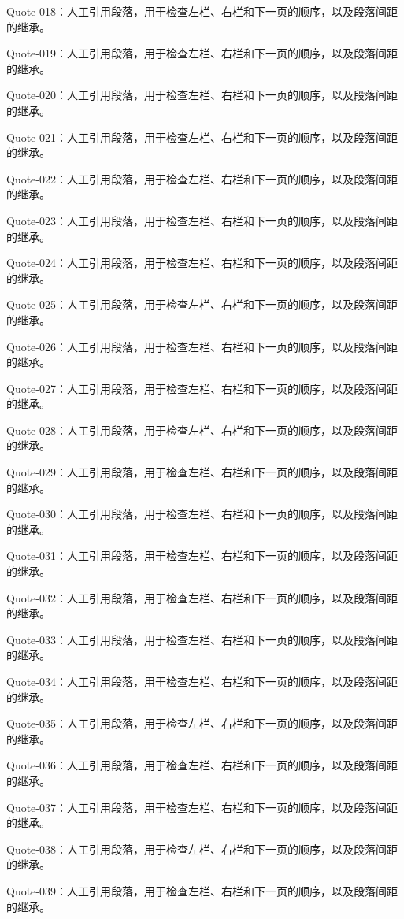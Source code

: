 \documentclass{article}
\begin{document}
\begin{quoteblock}
Quote-018：人工引用段落，用于检查左栏、右栏和下一页的顺序，以及段落间距的继承。

Quote-019：人工引用段落，用于检查左栏、右栏和下一页的顺序，以及段落间距的继承。

Quote-020：人工引用段落，用于检查左栏、右栏和下一页的顺序，以及段落间距的继承。

Quote-021：人工引用段落，用于检查左栏、右栏和下一页的顺序，以及段落间距的继承。

Quote-022：人工引用段落，用于检查左栏、右栏和下一页的顺序，以及段落间距的继承。

Quote-023：人工引用段落，用于检查左栏、右栏和下一页的顺序，以及段落间距的继承。

Quote-024：人工引用段落，用于检查左栏、右栏和下一页的顺序，以及段落间距的继承。

Quote-025：人工引用段落，用于检查左栏、右栏和下一页的顺序，以及段落间距的继承。

Quote-026：人工引用段落，用于检查左栏、右栏和下一页的顺序，以及段落间距的继承。

Quote-027：人工引用段落，用于检查左栏、右栏和下一页的顺序，以及段落间距的继承。

Quote-028：人工引用段落，用于检查左栏、右栏和下一页的顺序，以及段落间距的继承。

Quote-029：人工引用段落，用于检查左栏、右栏和下一页的顺序，以及段落间距的继承。

Quote-030：人工引用段落，用于检查左栏、右栏和下一页的顺序，以及段落间距的继承。

Quote-031：人工引用段落，用于检查左栏、右栏和下一页的顺序，以及段落间距的继承。

Quote-032：人工引用段落，用于检查左栏、右栏和下一页的顺序，以及段落间距的继承。

Quote-033：人工引用段落，用于检查左栏、右栏和下一页的顺序，以及段落间距的继承。

Quote-034：人工引用段落，用于检查左栏、右栏和下一页的顺序，以及段落间距的继承。

Quote-035：人工引用段落，用于检查左栏、右栏和下一页的顺序，以及段落间距的继承。

Quote-036：人工引用段落，用于检查左栏、右栏和下一页的顺序，以及段落间距的继承。

Quote-037：人工引用段落，用于检查左栏、右栏和下一页的顺序，以及段落间距的继承。

Quote-038：人工引用段落，用于检查左栏、右栏和下一页的顺序，以及段落间距的继承。

Quote-039：人工引用段落，用于检查左栏、右栏和下一页的顺序，以及段落间距的继承。


\end{quoteblock}
\end{document}
